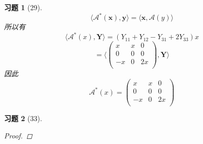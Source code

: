 \documentclass[a4paper, UTF8]{ctexart}
\newtheorem*{exercise}{\textbf{习题}}
\begin{document}
\begin{exercise}[29]
	\begin{equation*}
		\langle \mathcal{A}^* \left( \mathbf{x} \right), \mathbf{y} \rangle = \langle \mathbf{x}, \mathcal{A}\left( y \right) \rangle
	\end{equation*}
	所以有
	\begin{equation*}
		\langle \mathcal{A}^* \left( x \right), \mathbf{Y} \rangle = \left( Y_{11} + Y_{12} - Y_{31} + 2Y_{33} \right) x
	\end{equation*}
	\begin{equation*}
		= \langle \left(
		\begin{array}{ccc}
			x  & x & 0  \\
			0  & 0 & 0  \\
			-x & 0 & 2x \\
		\end{array}
		\right) ,\mathbf{Y} \rangle
	\end{equation*}
	因此
	\begin{equation*}
		\mathcal{A}^*\left( x \right) = \left(
		\begin{array}{ccc}
			x  & x & 0  \\
			0  & 0 & 0  \\
			-x & 0 & 2x \\
		\end{array} \right)
	\end{equation*}
\end{exercise}
\begin{exercise}[33]
  \begin{proof}
  \end{proof}
\end{exercise}
\end{document}

